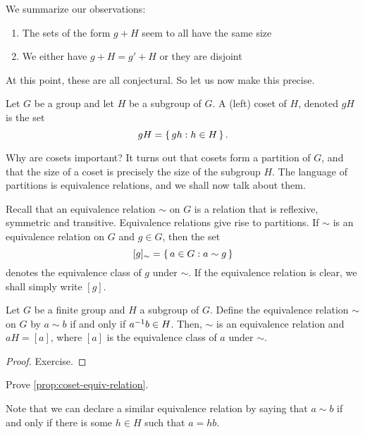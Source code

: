 \documentclass[./main.tex]{subfiles}
\begin{document}
We summarize our observations: 

\begin{enumerate}
    \item The sets of the form $g + H$ seem to all have the same size 
    \item We either have $g+H = g'+H$ or they are disjoint
\end{enumerate}

At this point, these are all conjectural. So let us now make this precise.

\begin{definition}[Coset]
\label{def:coset}
Let $G$ be a group and let $H$ be a subgroup of $G$. A (left) coset of $H$,
denoted $gH$ is the set 
\[
    gH = \set{gh: h \in H}.
\]
\end{definition}

Why are cosets important? It turns out that cosets form a partition of $G$, and
that the size of a coset is precisely the size of the subgroup $H$. The language
of partitions is equivalence relations, and we shall now talk about them.

Recall that an equivalence relation $\sim$ on $G$ is a relation that is
reflexive, symmetric and transitive. Equivalence relations give rise to
partitions. If $\sim$ is an equivalence relation on $G$ and $g \in G$, then the
set 
\[
    [g]_\sim = \set{a \in G: a \sim g}
\]
denotes the equivalence class of $g$ under $\sim$. If the equivalence
relation is clear, we shall simply write $[g]$.
\begin{proposition}
\label{prop:coset-equiv-relation}
    Let $G$ be a finite group and $H$ a subgroup of $G$. Define the equivalence
    relation $\sim$ on $G$ by $a \sim b$ if and only if $a^{-1} b \in H$. Then,
    $\sim$ is an equivalence relation and $aH = [a]$, where $[a]$ is the
    equivalence class of $a$ under $\sim$.
\end{proposition}
\begin{proof}
    Exercise.
\end{proof}
\begin{exercise}
    Prove \cref{prop:coset-equiv-relation}.
\end{exercise}

Note that we can declare a similar equivalence relation by saying that $a \sim
b$ if and only if there is some $h \in H$ such that $a = hb$.
\end{document}
